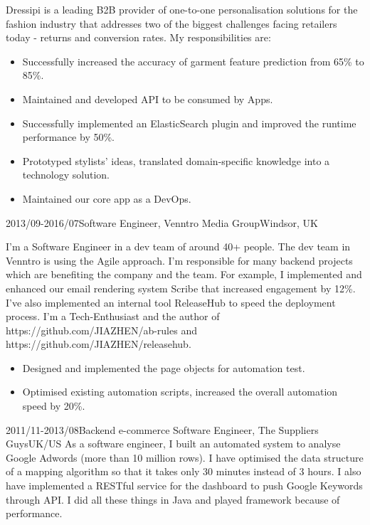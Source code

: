 \documentclass[a4paper]{twentysecondcv-english} %
\begin{document}
\begin{twenty}
    	{Dressipi is a leading B2B provider of one-to-one personalisation solutions for the fashion industry that addresses two of the biggest challenges facing retailers today - returns and conversion rates. My responsibilities are:
        	\begin{itemize}
                \item Successfully increased the accuracy of garment feature prediction from 65\% to 85\%.
                \item Maintained and developed API to be consumed by Apps.
                \item Successfully implemented an ElasticSearch plugin and improved the runtime performance by 50\%.
                \item Prototyped stylists' ideas, translated domain-specific knowledge into a technology solution.
                \item Maintained our core app as a DevOps.
            \end{itemize}}
\end{twenty}

\newpage %
\makesidebar

\begin{twenty}
    \twentyitem
	    {2013/09-2016/07}{Software Engineer, Venntro Media Group}{Windsor, UK}
    	{I'm a Software Engineer in a dev team of around 40+ people. The dev team in Venntro is using the Agile approach. I'm responsible for many backend projects which are benefiting the company and the team. For example, I implemented and enhanced our email rendering system Scribe that increased engagement by 12\%. I've also implemented an internal tool ReleaseHub to speed the deployment process. I'm a Tech-Enthusiast and the author of https://github.com/JIAZHEN/ab-rules and https://github.com/JIAZHEN/releasehub.
        	\begin{itemize}
                \item Designed and implemented the page objects for automation test.
                \item Optimised existing automation scripts, increased the overall automation speed by 20\%.
            \end{itemize}}
    \twentyitem
	    {2011/11-2013/08}{Backend e-commerce Software Engineer, The Suppliers Guys}{UK/US}
    	{As a software engineer, I built an automated system to analyse Google Adwords (more than 10 million rows). I have optimised the data structure of a mapping algorithm so that it takes only 30 minutes instead of 3 hours. I also have implemented a RESTful service for the dashboard to push Google Keywords through API. I did all these things in Java and played framework because of performance.}
\end{twenty}
\end{document}
